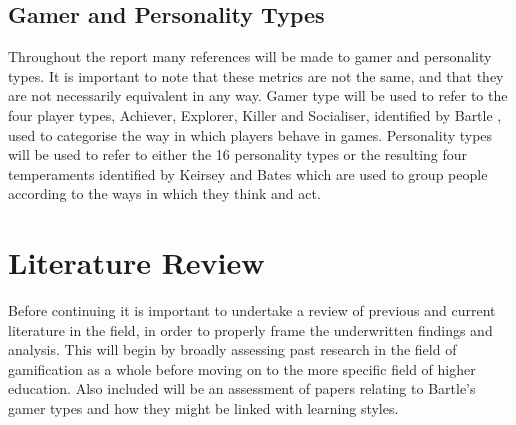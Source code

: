 \documentclass[12pt]{article}
\begin{document}
\subsection{Gamer and Personality Types}
Throughout the report many references will be made to gamer and personality types. It is important to note that these metrics are not the same, and that they are not necessarily equivalent in any way. Gamer type will be used to refer to the four player types, Achiever, Explorer, Killer and Socialiser, identified by Bartle \cite{bartle1996hearts}, used to categorise the way in which players behave in games. Personality types will be used to refer to either the 16 personality types or the resulting four temperaments identified by Keirsey and Bates \cite{keirsey1984} which are used to group people according to the ways in which they think and act.

\section{Literature Review}
Before continuing it is important to undertake a review of previous and current literature in the field, in order to properly frame the underwritten findings and analysis. This will begin by broadly assessing past research in the field of gamification as a whole before moving on to the more specific field of higher education. Also included will be an assessment of papers relating to Bartle's gamer types and how they might be linked with learning styles.
\end{document}

